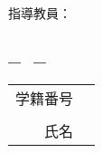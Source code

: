 \begin{titlepage}
\begin{center}{\large
\nendo ~~\daigaku ~\gakubu ~~\syubetsu
}
\end{center}
\begin{flushright}

{\large
指導教員： \chiefexaminer \\ %
}
\end{flushright}
\begin{center}
\vspace*{150truept}
{\huge \thesistitle}\\ %
\vspace{10truept}
{\Large ―~\thesissubtitle~―}\\ %
\vspace{150truept}
{\Large
\begin{tabular}{rl}
学籍番号 & \hspace{1zw}{\snum}\\
 & \\
氏名 & \hspace{1zw}{\jname}\\
\end{tabular}
}\\
\vspace{70truept}
{\large \teisyutsu}\\ %
\end{center}
\end{titlepage}
